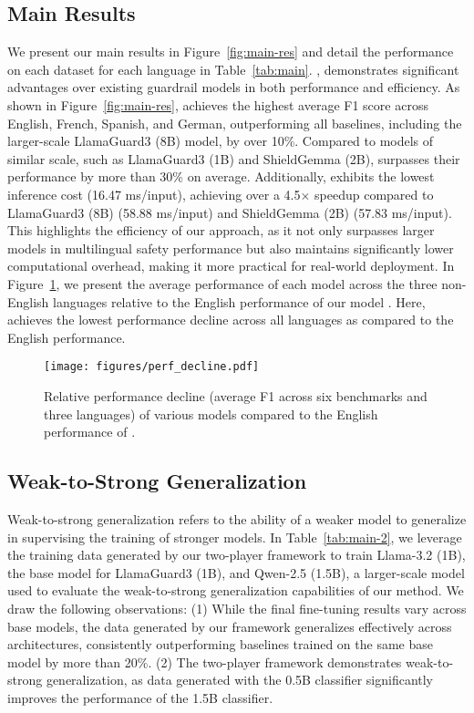 \subsection{Main Results}
We present our main results in Figure~\ref{fig:main-res} and detail the performance on each dataset for each language in Table~\ref{tab:main}. \ours, demonstrates significant advantages over existing guardrail models in both performance and efficiency. As shown in Figure~\ref{fig:main-res}, \ours achieves the highest average F1 score across English, French, Spanish, and German, outperforming all baselines, including the larger-scale LlamaGuard3 (8B) model, by over 10\%. Compared to models of similar scale, such as LlamaGuard3 (1B) and ShieldGemma (2B), \ours surpasses their performance by more than 30\% on average. Additionally, \ours exhibits the lowest inference cost (16.47 ms/input), achieving over a 4.5$\times$ speedup compared to LlamaGuard3 (8B) (58.88 ms/input) and ShieldGemma (2B) (57.83 ms/input). This highlights the efficiency of our approach, as it not only surpasses larger models in multilingual safety performance but also maintains significantly lower computational overhead, making it more practical for real-world deployment. In Figure~\ref{fig:perf_decline}, we present the average performance of each model across the three non-English languages relative to the English performance of our model \ours. Here, \ours achieves the lowest performance decline across all languages as compared to the English performance.


\begin{figure}[!ht]
    \centering
    \texttt{[image: figures/perf\_decline.pdf]}
    \vspace{-3mm}
    \caption{Relative performance decline (average F1 across six benchmarks and three languages) of various models compared to the English performance of \ours.}
    \label{fig:perf_decline}
\end{figure}

\subsection{Weak-to-Strong Generalization}
Weak-to-strong generalization refers to the ability of a weaker model to generalize in supervising the training of stronger models. In Table~\ref{tab:main-2}, we leverage the training data generated by our two-player framework to train Llama-3.2 (1B), the base model for LlamaGuard3 (1B), and Qwen-2.5 (1.5B), a larger-scale model used to evaluate the weak-to-strong generalization capabilities of our method. 
We draw the following observations: (1) While the final fine-tuning results vary across base models, the data generated by our framework generalizes effectively across architectures, consistently outperforming baselines trained on the same base model by more than 20\%. (2) The two-player framework demonstrates weak-to-strong generalization, as data generated with the 0.5B classifier significantly improves the performance of the 1.5B classifier.\vspace{-3mm}

